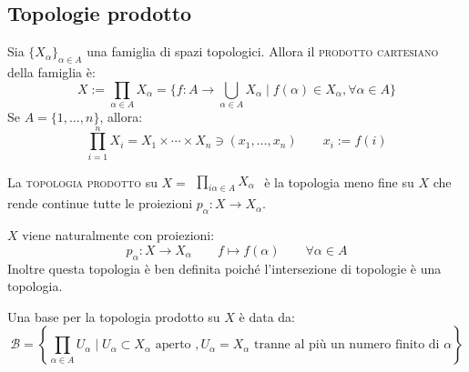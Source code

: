 \documentclass{article}
\begin{document}
\subsection{Topologie prodotto}

\begin{defn}
	Sia $\{X_\alpha\}_{\alpha \in A}$ una famiglia di spazi topologici. Allora
	il \textsc{prodotto cartesiano} della famiglia è:
	$$X:=\prod_{\alpha \in A} X_\alpha = \{f:A \longrightarrow \bigcup _{\alpha
	\in A} X_\alpha  \mid f(\alpha)\in X_\alpha, \forall \alpha \in A\} $$
	Se $A=\{1, \dots ,n\}$, allora:
	$$\prod_{i=1}^n X_i=X_1 \times \cdots \times X_n \ni (x_1, \dots ,x_n)
	\qquad x_i:=f(i)$$
\end{defn}
\begin{defn}
	La \textsc{topologia prodotto} su $X=\begin{matrix} \prod_{i\alpha \in A}
	X_\alpha \end{matrix}	$ è la topologia meno fine su $X$ che rende
	continue tutte le proiezioni $p_\alpha : X \longrightarrow X_\alpha$.
\end{defn}
\begin{oss}
	$X$ viene naturalmente con proiezioni:
	$$p_\alpha :X \longrightarrow X_\alpha \qquad f \longmapsto f(\alpha) \qquad
	\forall \alpha \in A$$
	Inoltre questa topologia è ben definita poiché l'intersezione di topologie è
	una topologia.
\end{oss}
\begin{prop}
	Una base per la topologia prodotto su $X$ è data da:
	$$\mathcal{B}=\left \{\prod_{\alpha \in A} U_\alpha \mid U_\alpha \subset
	X_\alpha \text{ aperto }, U_\alpha =X_\alpha \text{ tranne al più 		un
	numero finito di }\alpha \right \}$$
\end{prop}
\end{document}
